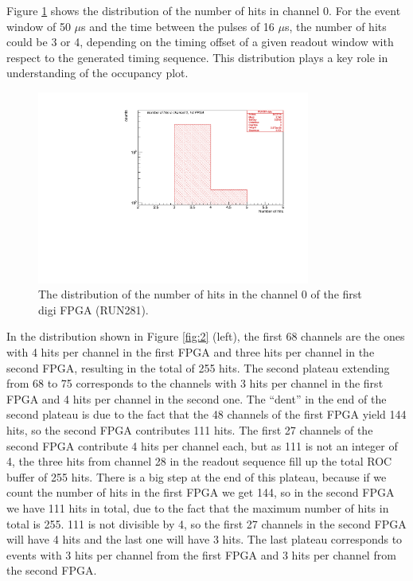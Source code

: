 Figure \ref{fig:66} shows the distribution of the number of hits in channel 0.
For the event window of 50 $\mu$s and the time between the pulses of 16 $\mu$s,
the number of hits could be 3 or 4,
depending on the timing offset of a given readout window with respect to the generated timing sequence.
This distribution plays a key role in understanding of the occupancy plot.
\begin{figure}[!h]
\centering
\includegraphics[width =0.8\textwidth]{figures/pdf/figure_00066_nhits_ch00_run281.pdf}
\caption{
  The distribution of the number of hits in the channel 0 of the first digi FPGA (RUN281).
}
\label{fig:66}
\end{figure}

In the distribution shown in Figure \ref{fig:2} (left),
the first 68 channels are the ones with 4 hits per channel in the first FPGA
and three hits per channel in the second FPGA, 
resulting in the total of 255 hits.
The second plateau extending from 68 to 75 corresponds to the channels
with 3 hits per channel in the first FPGA and 4 hits per channel in the second one.
  The ``dent'' in the end of the second plateau is due to the fact that the 48 channels of the first FPGA
  yield 144 hits, so the second FPGA contributes 111 hits. The first 27 channels of the second FPGA contribute
  4 hits per channel each, but as 111 is not an integer of 4, the three hits from channel 28 in the readout sequence
  fill up the total ROC buffer of 255 hits.
There is a big step at the end of this plateau, because if we count the number of hits
in the first FPGA we get 144, so in the second FPGA we have 111 hits in total,
due to the fact that the maximum number of hits in total is 255.
111 is not divisible by 4, so the first 27 channels in the second FPGA will have 4 hits
and the last one will have 3 hits.
The last plateau corresponds to events with 3 hits per channel from the first FPGA
and 3 hits per channel from the second FPGA.

